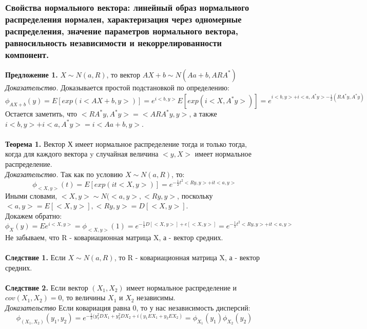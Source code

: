 \subsubsection{Свойства нормального вектора: линейный образ нормального распределения нормален, характеризация через одномерные распределения, значение параметров нормального вектора, равносильность независимости и некоррелированности компонент.}
\textbf{Предложение 1.} $X\sim N(a, R)$, то вектор $AX + b\sim N(Aa + b, ARA^*)$\\
\textit{Доказательство.} Доказывается простой подстановкой по определению:\\
$\phi_{AX + b}(y) =  E[exp(i<AX + b, y>)] = e^{i<b, y>}E[exp(i<X, A^*y>)] = e^{i<b, y> + i<a, A^*y> - \frac{1}{2}(RA^*y, A^*y)}$\\
Остается заметить, что $<RA^*y, A^*y> = <ARA^*y, y>$, а также $i<b, y> + i<a, A^*y>  = i<Aa + b, y>$.\\
\\
\textbf{Теорема 1.} Вектор Х имеет нормальное распределение тогда и только тогда, когда для каждого вектора y случайная величина $<y, X>$ имеет нормальное распределение.\\
\textit{Доказательство.} Так как по условию $X \sim N(a, R)$, то:\\
$$\phi_{<X, y>}(t) = E[exp(it<X, y>)] = e^{-\frac{1}{2}t^2<Ry, y> + it<a, y>}$$
Иными словами, $<X, y> \sim N(<a, y>, <Ry, y>$, поскольку $<a, y> = E[<X, y>], <Ry, y> = D[<X, y>]$.\\
Докажем обратно:\\
$$\phi_{X}(y) = Ee^{i<X, y>} = \phi_{<X, y>}(1) = e^{-\frac{1}{2}D[<X, y>] + e[<X, y>]} = e^{-\frac{1}{2}t^2<Ry, y> + it<a, y>}$$
Не забываем, что R - ковариационная матрица X, а - вектор средних.\\
\\
\textbf{Следствие 1.} Если $X \sim N(a, R)$, то R - ковариационная матрица X, а - вектор средних.\\
\\
\textbf{Следствие 2.} Если вектор $(X_1, X_2)$ имеет нормальное распределение и $cov(X_1, X_2) = 0$, то величины $X_1$ и $X_2$ независимы.\\
\textit{Доказательство} Если ковариация равна 0, то у нас независимость дисперсий:\\
$$\phi_{(X_1, X_2)}(y_1, y_2) = e^{-\frac{1}{2}(y_1^2DX_1 + y_2^2DX_2 + i(y_1EX_1 + y_2EX_2)} = \phi_{X_1}(y_1)\phi_{X_2}(y_2)$$

